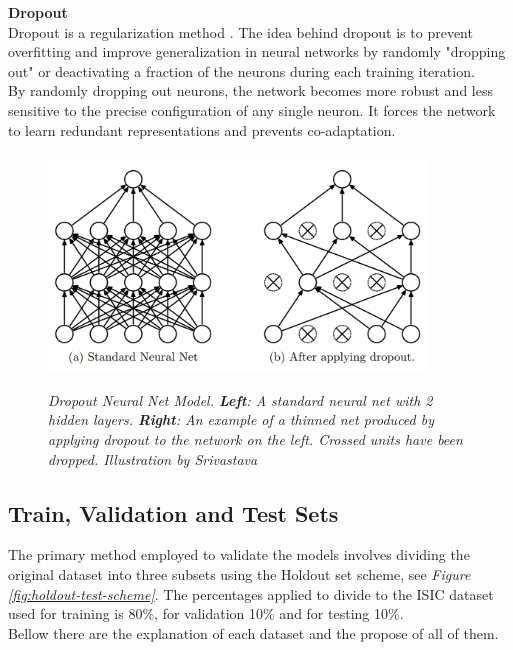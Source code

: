 \newpage

\textbf{Dropout} \\

Dropout is a regularization method \cite{DropoutPaper}. The idea behind dropout is to prevent overfitting and improve generalization in neural networks by randomly "dropping out" or deactivating a fraction of the neurons during each training iteration. \\

By randomly dropping out neurons, the network becomes more robust and less sensitive to the precise configuration of any single neuron. It forces the network to learn redundant representations and prevents co-adaptation.

\begin{figure}[H]
\centering
\includegraphics[width=10cm]{imatges/preliminaries/dropout.png}
\caption[Dropout]{\textit{Dropout Neural Net Model. \textbf{Left}: A standard neural net with 2 hidden layers. \textbf{Right}:
An example of a thinned net produced by applying dropout to the network on the left.
Crossed units have been dropped. Illustration by Srivastava}}
{\label{fig:dropout}}
\end{figure}

\subsection{Train, Validation and Test Sets}

The primary method employed to validate the models involves dividing the original dataset into three subsets using the Holdout set scheme, see \textit{Figure \ref{fig:holdout-test-scheme}}. The percentages applied to divide to the ISIC dataset used for training is 80\%, for validation 10\% and for testing 10\%. \\

Bellow there are the explanation of each dataset and the propose of all of them. \\


